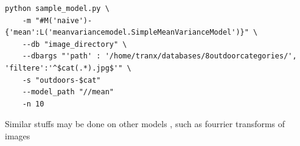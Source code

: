 \documentclass{report}
\begin{document}
\begin{lstlisting}
python sample_model.py \
    -m "#M('naive')-{'mean':L('meanvariancemodel.SimpleMeanVarianceModel')}" \
    --db "image_directory" \
    --dbargs "'path' : '/home/tranx/databases/8outdoorcategories/', 'filtere':'^$cat(.*).jpg$'" \
    -s "outdoors-$cat" 
    --model_path "//mean"
    -n 10

\end{lstlisting}








Similar stuffs may be done on other models , such as fourrier transforms of images
\end{document}
